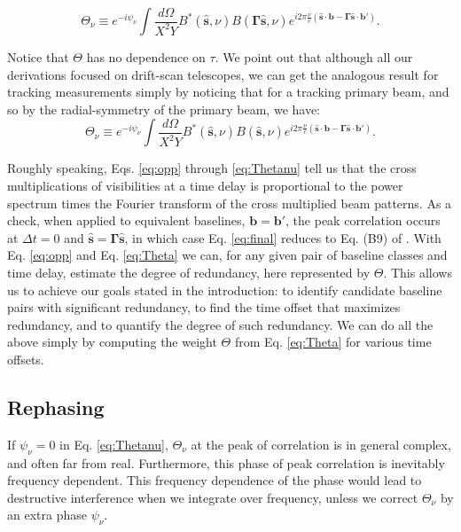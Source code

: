 \documentclass[twocolumn,apj,numberedappendix]{emulateapj}
\renewcommand\[{\begin{equation}}
\renewcommand\]{\end{equation}}
\begin{document}
\[
\Theta_{\nu} \equiv e^{-i\psi_{\nu}} \int \frac{d\Omega}{X^{2}Y}B^{*}(\hat{\boldsymbol{s}},\nu)B(\boldsymbol{\Gamma}\hat{\boldsymbol{s}},\nu) e^{i2\pi\frac{\nu}{c}\left(\hat{\boldsymbol{s}}\cdot\boldsymbol{b}-\boldsymbol{\Gamma}\hat{\boldsymbol{s}}\cdot\boldsymbol{b'}\right)}.
\label{eq:Thetanu}
\]


Notice that $\Theta$ has no dependence on $\tau$. We point out that although all our derivations focused on drift-scan telescopes, we can get the analogous result for tracking measurements simply by noticing that for a tracking primary beam, and so by the radial-symmetry of the primary beam, we have:
\[
\Theta_{\nu} \equiv e^{-i\psi_{\nu}} \int \frac{d\Omega}{X^{2}Y}B^{*}(\hat{\boldsymbol{s}},\nu)B(\hat{\boldsymbol{s}},\nu) e^{i2\pi\frac{\nu}{c}\left(\hat{\boldsymbol{s}}\cdot\boldsymbol{b}-\boldsymbol{\Gamma}\hat{\boldsymbol{s}}\cdot\boldsymbol{b'}\right)}.
\label{eq:Thetanu_tracking}
\]

Roughly speaking, Eqs. \eqref{eq:opp} through \eqref{eq:Thetanu} tell us that the cross multiplications of visibilities at a time delay is proportional to the power spectrum times the Fourier
transform of the cross multiplied beam patterns. As a check, when applied to equivalent baselines,
$\boldsymbol{b}=\boldsymbol{b'}$, the peak correlation occurs at $\Delta t=0$ and $\hat{\boldsymbol{s}}=\boldsymbol{\Gamma}\hat{\boldsymbol{s}}$, in which case Eq. \eqref{eq:final} reduces to Eq. (B9) of \cite{paper32}. 
With Eq. \eqref{eq:opp} and Eq. \eqref{eq:Theta} we can, for any given pair of baseline classes and time delay, estimate the degree of redundancy, here represented by $\Theta$. This allows us to achieve our goals stated in the introduction: to identify 
candidate baseline pairs with significant redundancy, to find the time offset that maximizes redundancy, and to quantify the degree of such redundancy. We can do all the above simply by computing the weight $\Theta$ from
Eq. \eqref{eq:Theta} for various time offsets. 



\subsection{Rephasing \label{sec:rephs}}
If $\psi_{\nu}=0$ in  Eq. \eqref{eq:Thetanu}, $\Theta_{\nu}$ at the peak of correlation is in general complex, and often far from real. Furthermore, this phase of peak correlation is inevitably frequency dependent. This frequency dependence of the phase would lead to destructive interference when we integrate over frequency, unless we correct $\Theta_{\nu}$ by an extra phase $\psi_\nu$. 
\end{document}
